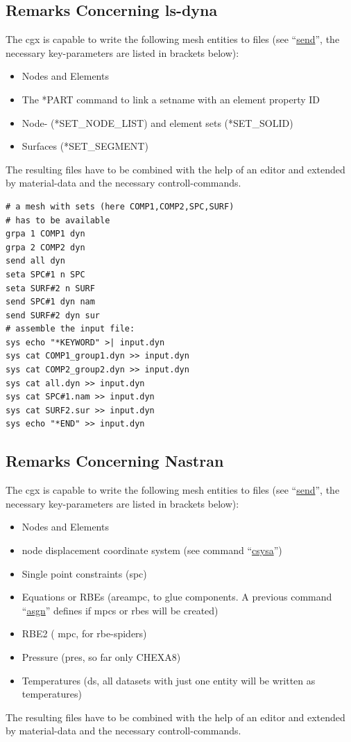 \documentclass{article}
\providecommand{\htmlref}[2]{\hyperref[#2]{#1}}
\begin{document}
\begin{appendix}
\subsection{\label{Remarks Concerning ls-dyna}Remarks Concerning ls-dyna}
The cgx is capable to write the following mesh entities to files (see ``\htmlref{send}{send}'', the necessary key-parameters are listed in brackets below):
\begin{itemize}
\item Nodes and Elements 
\item The *PART command to link a setname with an element property ID 
\item Node- (*SET\_NODE\_LIST) and element sets (*SET\_SOLID)
\item Surfaces (*SET\_SEGMENT)
\end{itemize}
The resulting files have to be combined with the help of an editor and extended by material-data and the necessary controll-commands. 
\begin{verbatim}
# a mesh with sets (here COMP1,COMP2,SPC,SURF)
# has to be available
grpa 1 COMP1 dyn
grpa 2 COMP2 dyn
send all dyn
seta SPC#1 n SPC
seta SURF#2 n SURF
send SPC#1 dyn nam
send SURF#2 dyn sur
# assemble the input file:
sys echo "*KEYWORD" >| input.dyn
sys cat COMP1_group1.dyn >> input.dyn
sys cat COMP2_group2.dyn >> input.dyn
sys cat all.dyn >> input.dyn
sys cat SPC#1.nam >> input.dyn
sys cat SURF2.sur >> input.dyn
sys echo "*END" >> input.dyn
\end{verbatim}

\subsection{\label{Remarks Concerning Nastran}Remarks Concerning Nastran}
The cgx is capable to write the following mesh entities to files (see ``\htmlref{send}{send}'', the necessary key-parameters are listed in brackets below):
\begin{itemize}
\item Nodes and Elements 
\item node displacement coordinate system (see command ``\htmlref{csysa}{csysa}'')
\item Single point constraints (spc)
\item Equations or RBEs (areampc, to glue components. A previous command ``\htmlref{asgn}{asgn}'' defines if mpcs or rbes will be created)
\item RBE2 ( mpc, for rbe-spiders)
\item Pressure (pres, so far only CHEXA8)
\item Temperatures (ds, all datasets with just one entity will be written as temperatures)
\end{itemize}
The resulting files have to be combined with the help of an editor and extended by material-data and the necessary controll-commands. 


\end{appendix}
\end{document}
